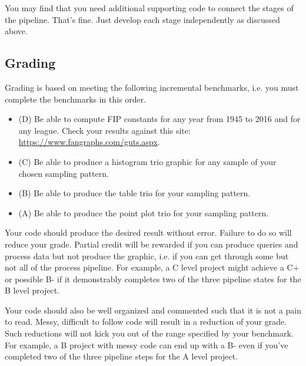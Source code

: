 \documentclass[10pt]{article}
\begin{document}
You may find that you need additional supporting code to connect the stages of the pipeline. That's fine. Just develop each stage independently as discussed above.

\subsection*{Grading}

Grading is based on meeting the following incremental benchmarks, i.e. you must complete the benchmarks in this order.
\begin{itemize}
  \item (D) Be able to compute FIP constants for any year from 1945 to 2016 and for any league. Check your results against this site: \url{https://www.fangraphs.com/guts.aspx}.
  \item (C) Be able to produce a histogram trio graphic for any sample of your chosen sampling pattern.
  \item (B) Be able to produce the table trio for your sampling pattern.
  \item (A) Be able to produce the point plot trio for your sampling pattern.
\end{itemize}

Your code should produce the desired result without error. Failure to do so will reduce your grade. Partial credit will be rewarded if you can produce queries and process data but not produce the graphic, i.e. if you can get through some but not all of the process pipeline. For example, a C level project might achieve a C+ or possible B- if it demonstrably completes two of the three pipeline states for the B level project.

Your code should also be well organized and commented such that it is not a pain to read. Messy, difficult to follow code will result in a reduction of your grade. Such reductions will not kick you out of the range specified by your benchmark. For example, a B project with messy code can end up with a B- even if you've completed two of the three pipeline steps for the A level project.
\end{document}
